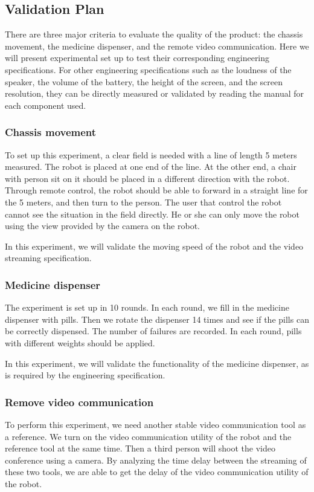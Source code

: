 \documentclass[12pt]{article}
\begin{document}
\subsection{Validation Plan}
There are three major criteria to evaluate the quality of the product: the chassis movement, the medicine dispenser, and the remote video communication. Here we will present experimental set up to test their corresponding engineering specifications. For other engineering specifications such as the loudness of the speaker, the volume of the battery, the height of the screen, and the screen resolution, they can be directly measured or validated by reading the manual for each component used.
\subsubsection{Chassis movement}
To set up this experiment, a clear field is needed with a line of length 5 meters measured. The robot is placed at one end of the line. At the other end, a chair with person sit on it should be placed in a different direction with the robot. Through remote control, the robot should be able to forward in a straight line for the 5 meters, and then turn to the person. The user that control the robot cannot see the situation in the field directly. He or she can only move the robot using the view provided by the camera on the robot.

In this experiment, we will validate the moving speed of the robot and the video streaming specification.

\subsubsection{Medicine dispenser}

The experiment is set up in 10 rounds. In each round, we fill in the medicine dispenser with pills. Then we rotate the dispenser 14 times and see if the pills can be correctly dispensed. The number of failures are recorded. In each round, pills with different weights should be applied.

In this experiment, we will validate the functionality of the medicine dispenser, as is required by the engineering specification.


\subsubsection{Remove video communication}
To perform this experiment, we need another stable video communication tool as a reference. We turn on the video communication utility of the robot and the reference tool at the same time. Then a third person will shoot the video conference using a camera. By analyzing the time delay between the streaming of these two tools, we are able to get the delay of the video communication utility of the robot.
\end{document}

